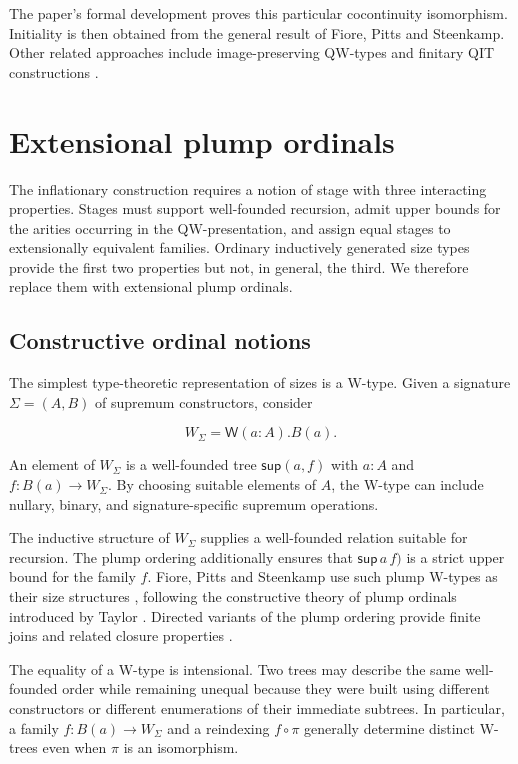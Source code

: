 \documentclass[runningheads]{llncs}
\begin{document}
The paper's formal development proves this particular cocontinuity
isomorphism. Initiality is then obtained from the general result of
Fiore, Pitts and Steenkamp. Other related approaches include
image-preserving QW-types and finitary QIT constructions
\citep{swan2022-hits-in-zf,van-der-weide2019-set-truncated-hits,
kaposi2019-constructing-qiit}.

\section{Extensional plump
ordinals}\label{extensional-plump-ordinals}

The inflationary construction requires a notion of stage with three
interacting properties. Stages must support well-founded recursion,
admit upper bounds for the arities occurring in the QW-presentation, and
assign equal stages to extensionally equivalent families. Ordinary
inductively generated size types provide the first two properties but
not, in general, the third. We therefore replace them with extensional
plump ordinals.

\subsection{Constructive ordinal
notions}\label{constructive-ordinal-notions}

The simplest type-theoretic representation of sizes is a W-type. Given a
signature \(\Sigma=(A,B)\) of supremum constructors, consider

\[
W_\Sigma = \mathsf{W} (a:A).B (a).
\]

An element of \(W_\Sigma\) is a well-founded tree \(\mathsf{sup} (a,f)\)
with \(a:A\) and \(f:B (a)\to W_\Sigma\). By choosing suitable elements
of \(A\), the W-type can include nullary, binary, and signature-specific
supremum operations.

The inductive structure of \(W_\Sigma\) supplies a well-founded relation
suitable for recursion. The plump ordering additionally ensures that
\(\mathsf{sup}\,a\,f)\) is a strict upper bound for the family \(f\).
Fiore, Pitts and Steenkamp use such plump W-types as their size
structures \citep{fiore2022-quotient-inductive}, following the
constructive theory of plump ordinals introduced by Taylor
\citep{taylor1996-plump}. Directed variants of the
plump ordering provide finite joins and related closure properties
\citep{gratzer2022-directed-plump-order}.

The equality of a W-type is intensional. Two trees may describe the same
well-founded order while remaining unequal because they were built using
different constructors or different enumerations of their immediate
subtrees. In particular, a family \(f:B (a)\to W_\Sigma\) and a
reindexing \(f\circ\pi\) generally determine distinct W-trees even when
\(\pi\) is an isomorphism.
\end{document}
